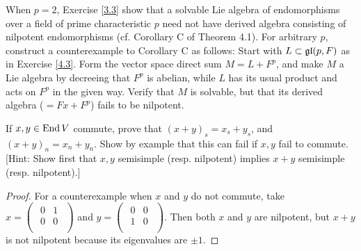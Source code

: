 \begin{ex}
  When $p = 2$, Exercise \ref{3.3} show that a solvable Lie algebra of endomorphisms over a field of prime characteristic $p$ need not have derived algebra consisting of nilpotent endomorphisms (cf. Corollary C of Theorem 4.1). For arbitrary $p$, construct a counterexample to Corollary C as follows: Start with $L \subset \mathfrak{g}\mathfrak{l}(p,F)$ as in Exercise \ref{4.3}. Form the vector space direct sum $M = L + F^p$, and make $M$ a Lie algebra by decreeing that $F^p$ is abelian, while $L$ has its usual product and acts on $F^p$ in the given way. Verify that $M$ is solvable, but that its derived algebra ($= Fx + F^p$) fails to be nilpotent.
\end{ex}

\begin{ex}
  If $x, y \in \operatorname{End} V$ commute, prove that $(x + y)_s = x_s + y_s$, and $(x + y)_n = x_n + y_n$. Show by example that this can fail if $x,y$ fail to commute. [Hint: Show first that $x, y$ semisimple (resp. nilpotent) implies $x+y$ semisimple (resp. nilpotent).]
\end{ex}
\begin{proof}
  For a counterexample when $x$ and $y$ do not commute, take $x = \begin{pmatrix}
                                                                    \begin{smallmatrix}
                                                                    0 & 1 \\
                                                                    0 & 0\\
                                                                    \end{smallmatrix}
                                                                  \end{pmatrix}$
                                                                  and $y = \begin{pmatrix}
                                                                             \begin{smallmatrix}
                                                                             0 & 0 \\
                                                                             1 & 0 \\
                                                                             \end{smallmatrix}
                                                                           \end{pmatrix}$.
  Then both $x$ and $y$ are nilpotent, but $x + y$ is not nilpotent because its eigenvalues are $\pm 1$.
\end{proof}

